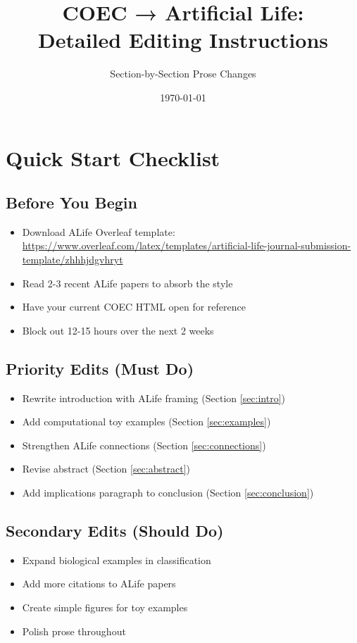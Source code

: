 \documentclass[11pt]{article}
\title{\textbf{COEC → Artificial Life:\\Detailed Editing Instructions}}
\author{Section-by-Section Prose Changes}
\date{\today}
\begin{document}
\maketitle

\tableofcontents
\newpage

\section{Quick Start Checklist}

\subsection{Before You Begin}
\begin{itemize}[label=$\square$]
    \item Download ALife Overleaf template: \url{https://www.overleaf.com/latex/templates/artificial-life-journal-submission-template/zhhhjdgvhryt}
    \item Read 2-3 recent ALife papers to absorb the style
    \item Have your current COEC HTML open for reference
    \item Block out 12-15 hours over the next 2 weeks
\end{itemize}

\subsection{Priority Edits (Must Do)}
\begin{itemize}[label=$\square$]
    \item Rewrite introduction with ALife framing (Section \ref{sec:intro})
    \item Add computational toy examples (Section \ref{sec:examples})
    \item Strengthen ALife connections (Section \ref{sec:connections})
    \item Revise abstract (Section \ref{sec:abstract})
    \item Add implications paragraph to conclusion (Section \ref{sec:conclusion})
\end{itemize}

\subsection{Secondary Edits (Should Do)}
\begin{itemize}[label=$\square$]
    \item Expand biological examples in classification
    \item Add more citations to ALife papers
    \item Create simple figures for toy examples
    \item Polish prose throughout
\end{itemize}
\end{document}
